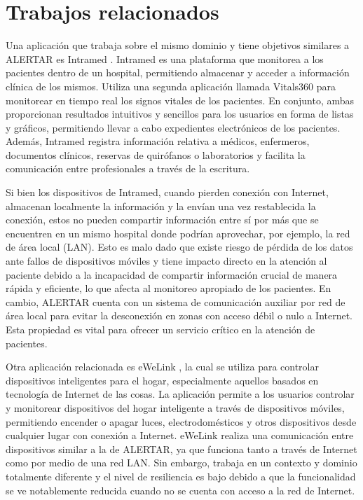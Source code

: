 \section{Trabajos relacionados}
Una aplicación que trabaja sobre el mismo dominio y tiene objetivos similares a ALERTAR es Intramed \cite{intraMed}. Intramed es una plataforma que monitorea a los pacientes dentro de un hospital, permitiendo almacenar y acceder a información clínica de los mismos. Utiliza una segunda aplicación llamada Vitals360 \cite{Vitals360} para monitorear en tiempo real los signos vitales de los pacientes. En conjunto, ambas proporcionan resultados intuitivos y sencillos para los usuarios en forma de listas y gráficos, permitiendo llevar a cabo expedientes electrónicos de los pacientes. Además, Intramed registra información relativa a médicos, enfermeros, documentos clínicos, reservas de quirófanos o laboratorios y facilita la comunicación entre profesionales a través de la escritura.

Si bien los dispositivos de Intramed, cuando pierden conexión con Internet, almacenan localmente la información y la envían una vez restablecida la conexión, estos no pueden compartir información entre sí por más que se encuentren en un mismo hospital donde podrían aprovechar, por ejemplo, la red de área local (LAN). Esto es malo dado que existe riesgo de pérdida de los datos ante fallos de dispositivos móviles y tiene impacto directo en la atención al paciente debido a la incapacidad de compartir información crucial de manera rápida y eficiente, lo que afecta al monitoreo apropiado de los pacientes. En cambio, ALERTAR cuenta con un sistema de comunicación auxiliar por red de área local para evitar la desconexión en zonas con acceso débil o nulo a Internet. Esta propiedad es vital para ofrecer un servicio crítico en la atención de pacientes.

Otra aplicación relacionada es eWeLink \cite{eWeLink}, la cual se utiliza para controlar dispositivos inteligentes para el hogar, especialmente aquellos basados en tecnología de Internet de las cosas. La aplicación permite a los usuarios controlar y monitorear dispositivos del hogar inteligente a través de dispositivos móviles, permitiendo encender o apagar luces, electrodomésticos y otros dispositivos desde cualquier lugar con conexión a Internet. eWeLink realiza una comunicación entre dispositivos similar a la de ALERTAR, ya que funciona tanto a través de Internet como por medio de una red LAN. Sin embargo, trabaja en un contexto y dominio totalmente diferente y el nivel de resiliencia es bajo debido a que la funcionalidad se ve notablemente reducida cuando no se cuenta con acceso a la red de Internet.

